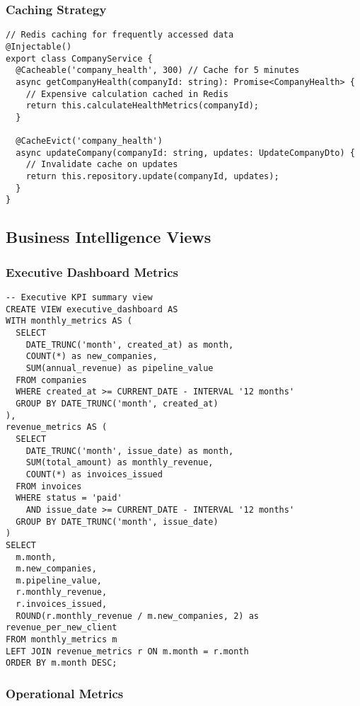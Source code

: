 \subsubsection{Caching Strategy}

\begin{verbatim}
// Redis caching for frequently accessed data
@Injectable()
export class CompanyService {
  @Cacheable('company_health', 300) // Cache for 5 minutes
  async getCompanyHealth(companyId: string): Promise<CompanyHealth> {
    // Expensive calculation cached in Redis
    return this.calculateHealthMetrics(companyId);
  }
  
  @CacheEvict('company_health')
  async updateCompany(companyId: string, updates: UpdateCompanyDto) {
    // Invalidate cache on updates
    return this.repository.update(companyId, updates);
  }
}
\end{verbatim}

\subsection{Business Intelligence Views}

\subsubsection{Executive Dashboard Metrics}

\begin{verbatim}
-- Executive KPI summary view
CREATE VIEW executive_dashboard AS
WITH monthly_metrics AS (
  SELECT 
    DATE_TRUNC('month', created_at) as month,
    COUNT(*) as new_companies,
    SUM(annual_revenue) as pipeline_value
  FROM companies 
  WHERE created_at >= CURRENT_DATE - INTERVAL '12 months'
  GROUP BY DATE_TRUNC('month', created_at)
),
revenue_metrics AS (
  SELECT 
    DATE_TRUNC('month', issue_date) as month,
    SUM(total_amount) as monthly_revenue,
    COUNT(*) as invoices_issued
  FROM invoices
  WHERE status = 'paid' 
    AND issue_date >= CURRENT_DATE - INTERVAL '12 months'
  GROUP BY DATE_TRUNC('month', issue_date)
)
SELECT 
  m.month,
  m.new_companies,
  m.pipeline_value,
  r.monthly_revenue,
  r.invoices_issued,
  ROUND(r.monthly_revenue / m.new_companies, 2) as revenue_per_new_client
FROM monthly_metrics m
LEFT JOIN revenue_metrics r ON m.month = r.month
ORDER BY m.month DESC;
\end{verbatim}

\subsubsection{Operational Metrics}

